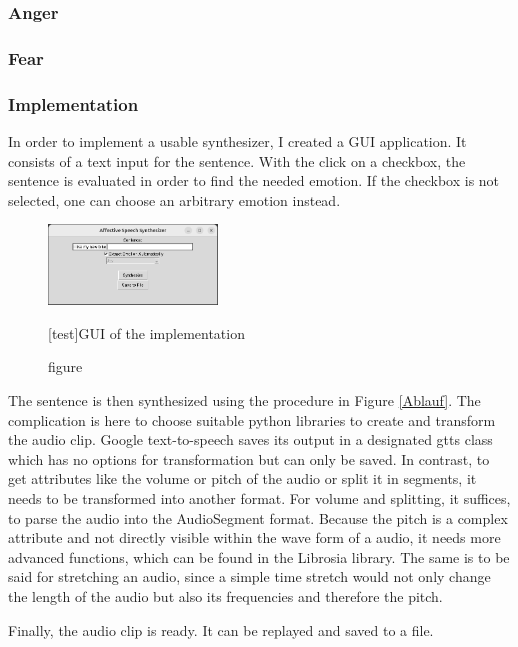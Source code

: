 \documentclass[11pt]{article}
\begin{document}
\subsubsection{Anger}

\subsubsection{Fear}

\subsubsection{Implementation}

In order to implement a usable synthesizer, I created a GUI application. It consists of a text input for the sentence. With the click on a checkbox, the sentence is evaluated in order to find the needed emotion. If the checkbox is not selected, one can choose an arbitrary emotion instead. 

\begin{figure}[h]
 \centering
\includegraphics[width=0.4\textwidth]{"Bilder/GUI.png"}
\caption{figure}[test]{GUI of the implementation}
\end{figure}

The sentence is then synthesized using the procedure in Figure \ref{Ablauf}. The complication is here to choose suitable python libraries to create and transform the audio clip. Google text-to-speech saves its output in a designated gtts class which has no options for transformation but can only be saved. In contrast, to get attributes like the volume or pitch of the audio or split it in segments, it needs to be transformed into another format. For volume and splitting, it suffices, to parse the audio into the AudioSegment format. Because the pitch is a complex attribute and not directly visible within the wave form of a audio, it needs more advanced functions, which can be found in the Librosia library. The same is to be said for stretching an audio, since a simple time stretch would not only change the length of the audio but also its frequencies and therefore the pitch.

Finally, the audio clip is ready. It can be replayed and saved to a file.
\end{document}

